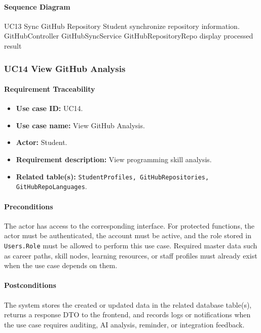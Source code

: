 \paragraph{Sequence Diagram}

\SequenceDiagram
{UC13 Sync GitHub Repository}
{Student}
{synchronize repository information.}
{GitHubController}
{GitHubSyncService}
{GitHubRepositoryRepo}
{display processed result}

\subsubsection{UC14 View GitHub Analysis}

\paragraph{Requirement Traceability}

\begin{itemize}
    \item \textbf{Use case ID:} UC14.
    \item \textbf{Use case name:} View GitHub Analysis.
    \item \textbf{Actor:} Student.
    \item \textbf{Requirement description:} View programming skill analysis.
    \item \textbf{Related table(s):} \texttt{StudentProfiles, GitHubRepositories, GitHubRepoLanguages}.
\end{itemize}

\paragraph{Preconditions}

The actor has access to the corresponding interface. For protected functions, the actor must be authenticated, the account must be active, and the role stored in \texttt{Users.Role} must be allowed to perform this use case. Required master data such as career paths, skill nodes, learning resources, or staff profiles must already exist when the use case depends on them.

\paragraph{Postconditions}

The system stores the created or updated data in the related database table(s), returns a response DTO to the frontend, and records logs or notifications when the use case requires auditing, AI analysis, reminder, or integration feedback.

